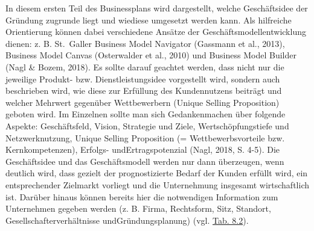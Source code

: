 \documentclass[
  letterpaper,
]{book}
\begin{document}
In diesem ersten Teil des Businessplans wird dargestellt, welche
Geschäftsidee der Gründung zugrunde liegt und wiediese umgesetzt werden
kann. Als hilfreiche Orientierung können dabei verschiedene Ansätze der
Geschäftsmodellentwicklung dienen: z. B. St.~Galler Business Model
Navigator (Gassmann et al., 2013), Business Model Canvas (Osterwalder et
al., 2010) und Business Model Builder (Nagl \& Bozem, 2018). Es sollte
darauf geachtet werden, dass nicht nur die jeweilige Produkt- bzw.
Dienstleistungsidee vorgestellt wird, sondern auch beschrieben wird, wie
diese zur Erfüllung des Kundennutzens beiträgt und welcher Mehrwert
gegenüber Wettbewerbern (Unique Selling Proposition) geboten wird. Im
Einzelnen sollte man sich Gedankenmachen über folgende Aspekte:
Geschäftsfeld, Vision, Strategie und Ziele, Wertschöpfungstiefe und
Netzwerknutzung, Unique Selling Proposition (= Wettbewerbsvorteile bzw.
Kernkompetenzen), Erfolgs- undErtragspotenzial (Nagl, 2018, S. 4-5). Die
Geschäftsidee und das Geschäftsmodell werden nur dann überzeugen, wenn
deutlich wird, dass gezielt der prognostizierte Bedarf der Kunden
erfüllt wird, ein entsprechender Zielmarkt vorliegt und die Unternehmung
insgesamt wirtschaftlich ist. Darüber hinaus können bereits hier die
notwendigen Information zum Unternehmen gegeben werden (z. B. Firma,
Rechtsform, Sitz, Standort, Gesellschafterverhältnisse
undGründungsplanung) (vgl. \hyperref[table82]{Tab. 8.2}).
\end{document}
